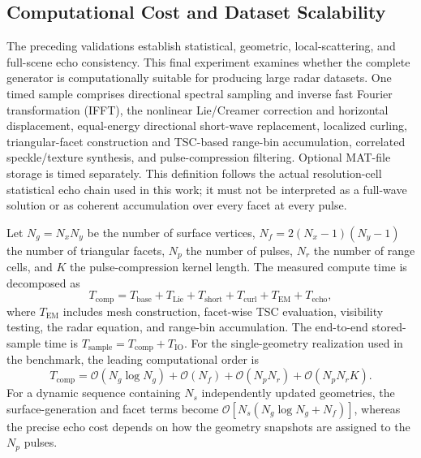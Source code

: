 \subsection{Computational Cost and Dataset Scalability}
\label{subsec:computational_efficiency}

The preceding validations establish statistical, geometric, local-scattering, and full-scene echo consistency. This final experiment examines whether the complete generator is computationally suitable for producing large radar datasets. One timed sample comprises directional spectral sampling and inverse fast Fourier transformation (IFFT), the nonlinear Lie/Creamer correction and horizontal displacement, equal-energy directional short-wave replacement, localized curling, triangular-facet construction and TSC-based range-bin accumulation, correlated speckle/texture synthesis, and pulse-compression filtering. Optional MAT-file storage is timed separately. This definition follows the actual resolution-cell statistical echo chain used in this work; it must not be interpreted as a full-wave solution or as coherent accumulation over every facet at every pulse.

Let $N_g=N_xN_y$ be the number of surface vertices, $N_f=2(N_x-1)(N_y-1)$ the number of triangular facets, $N_p$ the number of pulses, $N_r$ the number of range cells, and $K$ the pulse-compression kernel length. The measured compute time is decomposed as
\begin{equation}
T_{\mathrm{comp}}=T_{\mathrm{base}}+T_{\mathrm{Lie}}+T_{\mathrm{short}}+T_{\mathrm{curl}}+T_{\mathrm{EM}}+T_{\mathrm{echo}},
\label{eq:runtime_decomposition}
\end{equation}
where $T_{\mathrm{EM}}$ includes mesh construction, facet-wise TSC evaluation, visibility testing, the radar equation, and range-bin accumulation. The end-to-end stored-sample time is $T_{\mathrm{sample}}=T_{\mathrm{comp}}+T_{\mathrm{IO}}$. For the single-geometry realization used in the benchmark, the leading computational order is
\begin{equation}
T_{\mathrm{comp}}=\mathcal{O}(N_g\log N_g)+\mathcal{O}(N_f)+\mathcal{O}(N_pN_r)+\mathcal{O}(N_pN_rK).
\label{eq:runtime_complexity_single_snapshot}
\end{equation}
For a dynamic sequence containing $N_s$ independently updated geometries, the surface-generation and facet terms become $\mathcal{O}[N_s(N_g\log N_g+N_f)]$, whereas the precise echo cost depends on how the geometry snapshots are assigned to the $N_p$ pulses.

